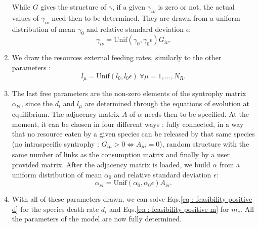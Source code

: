 \documentclass[12pt]{report}
\begin{document}
\begin{enumerate}
  While $G$ gives the structure of $\gamma$, \ie if a given $\gamma_{i\nu}$ is zero or not, the actual values of $\gamma_{i\nu}$ need then to be determined. They are drawn from a uniform distribution of mean $\gamma_0$ and relative standard deviation $\epsilon$:
  \begin{equation}
    \gamma_{i\nu} = \text{Unif}(\gamma_0, \gamma_0\epsilon) G_{i\nu}.
  \end{equation}
  \item We draw the resources external feeding rates, similarly to the other parameters :
  \begin{equation}
  l_\mu = \text{Unif}(l_0, l_0\epsilon) \ \forall \mu=1, \dots, N_R.
  \end{equation}
  \item The last free parameters are the non-zero elements of the syntrophy matrix $\alpha_{\nu i}$, since the $d_i$ and $l_\mu$ are determined through the equations of evolution at equilibrium. %
  The adjacency matrix $A$ of $\alpha$ needs then to be specified. At the moment, it can be chosen in four different ways : fully connected, in a way that no resource eaten by a given species can be released by that same species (\ie no intraspecific syntrophy : $G_{i\mu}>0 \iff A_{\mu i}=0$), random structure with the same number of links as the consumption matrix and finally by a user provided matrix. After the adjacency matrix is loaded, we build $\alpha$ from a uniform distribution of mean $\alpha_0$ and relative standard deviation $\epsilon$:
  \begin{equation}
    \alpha_{\nu i} = \text{Unif}(\alpha_0, \alpha_0\epsilon) A_{\nu i} .
  \end{equation}
  \item With all of these parameters drawn, we can solve Eqs.\eqref{eq : feasibility positive d} for the species death rate $d_i$ and Eqs.\eqref{eq : feasibility positive m} for $m_\nu$. All the parameters of the model are now fully determined.

\end{enumerate}
\end{document}
